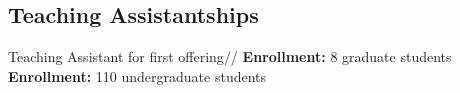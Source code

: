 \documentclass[10pt,letterpaper,final]{moderncv}
\begin{document}
	
\subsection{Teaching Assistantships}
{\small 
	Teaching Assistant for first offering}\vspace{6pt}//
	{\textcolor{color5}{\textbf{Enrollment:}}} 8 graduate students
{\small
	{\textcolor{color5}{\textbf{Enrollment:}}} 110 undergraduate students }\vspace{3pt}

\end{document}
